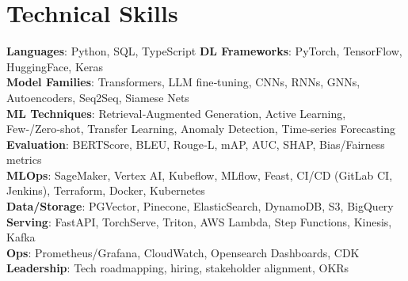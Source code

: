 \documentclass[letterpaper,11pt]{article}
\begin{document}
\section{Technical Skills}
\begin{itemize}[leftmargin=0.15in, label={}]
  \small{\item{
        \textbf{Languages}: Python, SQL, TypeScript  \textbar{}  \textbf{DL Frameworks}: PyTorch, TensorFlow, HuggingFace, Keras  \\
        \textbf{Model Families}: Transformers, LLM fine‑tuning, CNNs, RNNs, GNNs, Autoencoders, Seq2Seq, Siamese Nets  \\
        \textbf{ML Techniques}: Retrieval‑Augmented Generation, Active Learning, Few‑/Zero‑shot, Transfer Learning, Anomaly Detection, Time‑series Forecasting  \\
        \textbf{Evaluation}: BERTScore, BLEU, Rouge‑L, mAP, AUC, SHAP, Bias/Fairness metrics  \\
        \textbf{MLOps}: SageMaker, Vertex AI, Kubeflow, MLflow, Feast, CI/CD (GitLab CI, Jenkins), Terraform, Docker, Kubernetes  \\
        \textbf{Data/Storage}: PGVector, Pinecone, ElasticSearch, DynamoDB, S3, BigQuery  \\
        \textbf{Serving}: FastAPI, TorchServe, Triton, AWS Lambda, Step Functions, Kinesis, Kafka  \\
        \textbf{Ops}: Prometheus/Grafana, CloudWatch, Opensearch Dashboards, CDK  \\
        \textbf{Leadership}: Tech roadmapping, hiring, stakeholder alignment, OKRs
        }}
\end{itemize}
\end{document}
